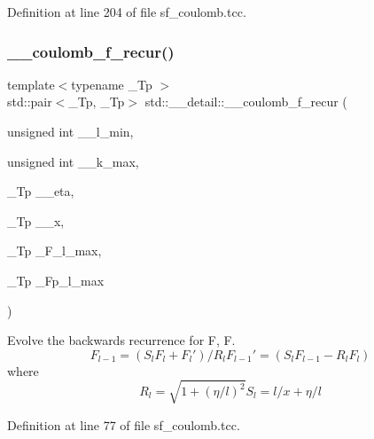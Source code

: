 Definition at line 204 of file sf\+\_\+coulomb.\+tcc.

\mbox{\label{namespacestd_1_1____detail_ab6a730206fba9db024f3c1c26fe6a954}} 
\subsubsection{\texorpdfstring{\+\_\+\+\_\+coulomb\+\_\+f\+\_\+recur()}{\_\_coulomb\_f\_recur()}}
{\footnotesize\ttfamily template$<$typename \+\_\+\+Tp $>$ \\
std\+::pair$<$\+\_\+\+Tp, \+\_\+\+Tp$>$ std\+::\+\_\+\+\_\+detail\+::\+\_\+\+\_\+coulomb\+\_\+f\+\_\+recur (\begin{DoxyParamCaption}\item[{unsigned int}]{\+\_\+\+\_\+l\+\_\+min,  }\item[{unsigned int}]{\+\_\+\+\_\+k\+\_\+max,  }\item[{\+\_\+\+Tp}]{\+\_\+\+\_\+eta,  }\item[{\+\_\+\+Tp}]{\+\_\+\+\_\+x,  }\item[{\+\_\+\+Tp}]{\+\_\+\+F\+\_\+l\+\_\+max,  }\item[{\+\_\+\+Tp}]{\+\_\+\+Fp\+\_\+l\+\_\+max }\end{DoxyParamCaption})}

Evolve the backwards recurrence for F, F\textquotesingle{}. \[ F_{l-1} = (S_l F_l + F_l') / R_l F_{l-1}' = (S_l F_{l-1} - R_l F_l) \] where \[ R_l = \sqrt{1 + (\eta / l)^2} S_l = l / x + \eta / l \] 

Definition at line 77 of file sf\+\_\+coulomb.\+tcc.

\mbox{\label{namespacestd_1_1____detail_ad3bcd9e0587db5699088065900382e8b}} 
